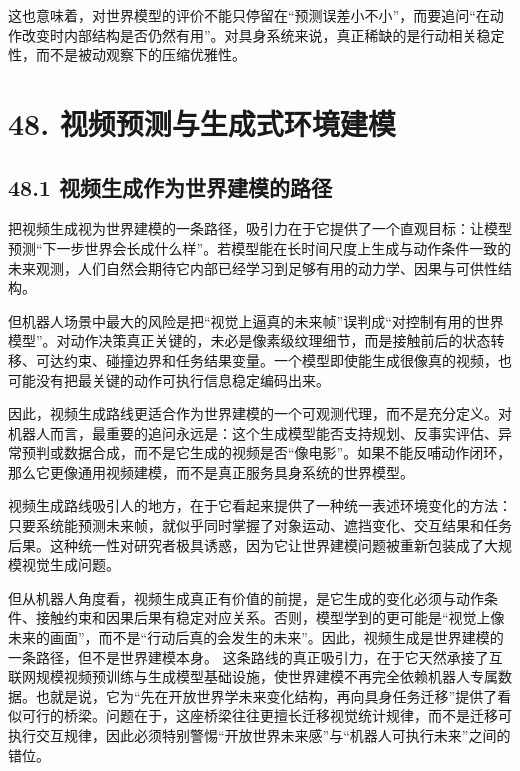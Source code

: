 这也意味着，对世界模型的评价不能只停留在“预测误差小不小”，而要追问“在动作改变时内部结构是否仍然有用”。对具身系统来说，真正稀缺的是行动相关稳定性，而不是被动观察下的压缩优雅性。

\chapter*{48. 视频预测与生成式环境建模}

\section*{48.1 视频生成作为世界建模的路径}


把视频生成视为世界建模的一条路径，吸引力在于它提供了一个直观目标：让模型预测“下一步世界会长成什么样”。若模型能在长时间尺度上生成与动作条件一致的未来观测，人们自然会期待它内部已经学习到足够有用的动力学、因果与可供性结构。

但机器人场景中最大的风险是把“视觉上逼真的未来帧”误判成“对控制有用的世界模型”。对动作决策真正关键的，未必是像素级纹理细节，而是接触前后的状态转移、可达约束、碰撞边界和任务结果变量。一个模型即使能生成很像真的视频，也可能没有把最关键的动作可执行信息稳定编码出来。

因此，视频生成路线更适合作为世界建模的一个可观测代理，而不是充分定义。对机器人而言，最重要的追问永远是：这个生成模型能否支持规划、反事实评估、异常预判或数据合成，而不是它生成的视频是否“像电影”。如果不能反哺动作闭环，那么它更像通用视频建模，而不是真正服务具身系统的世界模型。

视频生成路线吸引人的地方，在于它看起来提供了一种统一表述环境变化的方法：只要系统能预测未来帧，就似乎同时掌握了对象运动、遮挡变化、交互结果和任务后果。这种统一性对研究者极具诱惑，因为它让世界建模问题被重新包装成了大规模视觉生成问题。

但从机器人角度看，视频生成真正有价值的前提，是它生成的变化必须与动作条件、接触约束和因果后果有稳定对应关系。否则，模型学到的更可能是“视觉上像未来的画面”，而不是“行动后真的会发生的未来”。因此，视频生成是世界建模的一条路径，但不是世界建模本身。 这条路线的真正吸引力，在于它天然承接了互联网规模视频预训练与生成模型基础设施，使世界建模不再完全依赖机器人专属数据。也就是说，它为“先在开放世界学未来变化结构，再向具身任务迁移”提供了看似可行的桥梁。问题在于，这座桥梁往往更擅长迁移视觉统计规律，而不是迁移可执行交互规律，因此必须特别警惕“开放世界未来感”与“机器人可执行未来”之间的错位。

